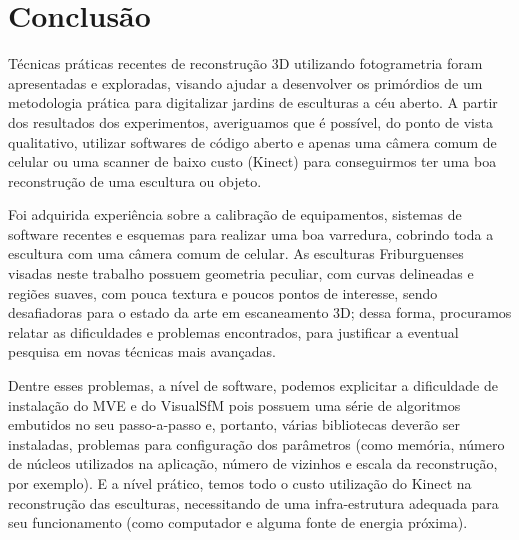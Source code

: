 \chapter{Conclusão}
Técnicas práticas recentes de reconstrução 3D utilizando fotogrametria foram
apresentadas e exploradas, visando
ajudar a desenvolver os primórdios de um metodologia prática para digitalizar jardins de esculturas a céu
aberto. A partir dos resultados dos experimentos, averiguamos que é possível, do ponto de vista qualitativo, utilizar softwares de código aberto e apenas uma câmera comum de celular ou uma scanner de baixo custo (Kinect) para conseguirmos ter uma boa reconstrução de uma escultura ou objeto.

Foi adquirida experiência sobre a calibração de equipamentos, sistemas
de software recentes e esquemas para realizar uma boa varredura, cobrindo toda a
escultura com uma câmera comum de celular.  As esculturas Friburguenses visadas neste trabalho
possuem geometria peculiar, com curvas delineadas e regiões suaves, com pouca
textura e poucos pontos de interesse, sendo desafiadoras para o estado da arte
em escaneamento 3D; dessa forma, procuramos relatar as dificuldades e problemas
encontrados, para justificar a eventual pesquisa em novas técnicas mais
avançadas. 

Dentre esses problemas, a nível de software, podemos explicitar a dificuldade de instalação do MVE e do VisualSfM pois possuem uma série de algoritmos embutidos no seu passo-a-passo e, portanto, várias bibliotecas deverão ser instaladas, problemas para configuração dos parâmetros (como memória, número de núcleos utilizados na aplicação, número de vizinhos e escala da reconstrução, por exemplo). E a nível prático, temos todo o custo utilização do Kinect na reconstrução das esculturas, necessitando de uma infra-estrutura adequada para seu funcionamento (como computador e alguma fonte de energia próxima).

